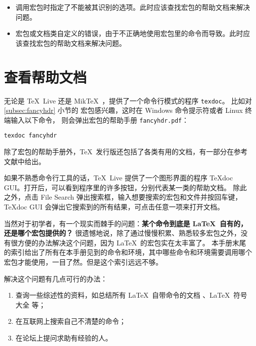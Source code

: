 \begin{itemize}
\item {}

调用宏包时指定了不能被其识别的选项。此时应该查找宏包的帮助文档来解决问题。

\item {}

宏包或文档类自定义的错误，由于不正确地使用宏包里的命令而导致。此时应该查找宏包的帮助文档来解决问题。

\end{itemize}

\section{查看帮助文档}\label{sec:texdoc}

无论是 \TeX\ Live 还是 Mik\TeX\ ，提供了一个命令行模式的程序 \texttt{texdoc}。
比如对 \ref{subsec:fancyhdr} 小节的  宏包感兴趣，这时在 Windows 命令提示符或者 Linux 终端输入以下命令，
则会弹出宏包的帮助手册 \texttt{fancyhdr.pdf}：
\begin{verbatim}
texdoc fancyhdr
\end{verbatim}

除了宏包的帮助手册外，\TeX\ 发行版还包括了各类有用的文档，有一部分在参考文献中给出。

如果不熟悉命令行工具的话，\TeX\ Live 提供了一个图形界面的程序 TeXdoc GUI。打开后，可以看到程序里的许多按钮，分别代表某一类的帮助文档。
除此之外，点击 File Search 弹出搜索框，输入想要搜索的宏包和文件并按回车键，TeXdoc GUI 会弹出它搜索到的所有结果，可点击任意一项来打开文档。

当然对于初学者，有一个现实而棘手的问题：\textbf{某个命令到底是 \LaTeX\ 自有的，还是哪个宏包提供的？}
很遗憾地说，除了通过慢慢积累、熟悉较多宏包之外，没有很方便的办法解决这个问题，因为 \LaTeX\ 的宏包实在太丰富了。
本手册末尾的索引给出了所有在本手册见到的命令和环境，其中哪些命令和环境需要调用哪个宏包才能使用，一目了然。但是这个索引远远不够。

解决这个问题有几点可行的办法：
\begin{enumerate}
  \item 查询一些综述性的资料，如总结所有 \LaTeX\ 自带命令的文档 \cite{latex2e}、\LaTeX\ 符号大全 \cite{symbols} 等；
  \item 在互联网上搜索自己不清楚的命令；
  \item 在论坛上提问求助有经验的人。
\end{enumerate}

